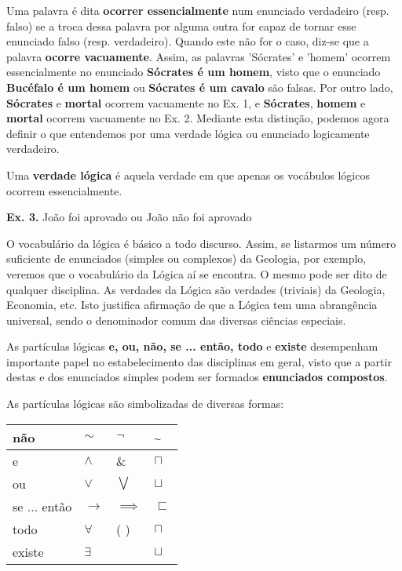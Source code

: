 Uma palavra é dita \textbf{ocorrer essencialmente} num enunciado verdadeiro (resp. falso) se a troca dessa palavra por alguma outra for capaz de tornar esse enunciado falso (resp. verdadeiro).
Quando este não for o caso, diz-se que a palavra \textbf{ocorre vacuamente}.
Assim, as palavras 'Sócrates' e 'homem' ocorrem essencialmente no enunciado \textbf{Sócrates é um homem}, visto que o enunciado \textbf{Bucéfalo é um homem} ou \textbf{Sócrates é um cavalo} são falsas.
Por outro lado, \textbf{Sócrates} e \textbf{mortal} ocorrem vacuamente no Ex. 1, e \textbf{Sócrates}, \textbf{homem} e \textbf{mortal} ocorrem vacuamente no Ex. 2.
Mediante esta distinção, podemos agora definir o que entendemos por uma verdade lógica ou enunciado logicamente verdadeiro.

Uma \textbf{verdade lógica} é aquela verdade em que apenas os vocábulos lógicos ocorrem essencialmente.

\noindent \textbf{Ex. 3.} João foi aprovado ou João não foi aprovado

O vocabulário da lógica é básico a todo discurso.
Assim, se listarmos um número suficiente de enunciados (simples ou complexos) da Geologia, por exemplo, veremos que o vocabulário da Lógica aí se encontra.
O mesmo pode ser dito de qualquer disciplina.
As verdades da Lógica são verdades (triviais) da Geologia, Economia, etc.
Isto justifica afirmação de que a Lógica tem uma abrangência universal, sendo o denominador comum das diversas ciências especiais.

As partículas lógicas \textbf{e, ou, não, se ... então, todo} e \textbf{existe} desempenham importante papel no estabelecimento das disciplinas em geral, visto que a partir destas e dos enunciados simples podem ser formados \textbf{enunciados compostos}.

As partículas lógicas são simbolizadas de diversas formas:
\bigskip
\begin{center}
    \large
    \begin{tabular}{l l l l}
        não          & $\sim$    & $\neg$                 & \textasciitilde \\ \hline
        e            & $\land$   & \&                     & $\sqcap$ \\ \hline
        ou           & $\lor$    & $\bigvee$              & $\sqcup$ \\ \hline
        se ... então & $\to$     & $\implies$             & $\sqsubset$  \\ \hline
        todo         & $\forall$ & \small( \small)        & \LARGE{$\sqcap$} \\ \hline
        existe       & $\exists$ & {$\exists$} & \LARGE{$\sqcup$}  \\ \hline
    \end{tabular}
\end{center}

